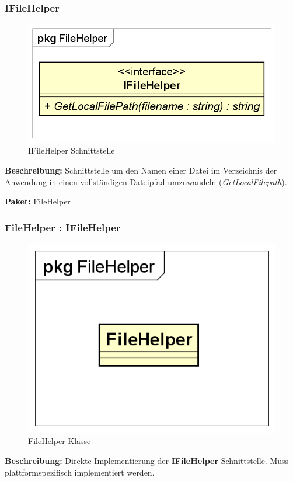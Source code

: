 \documentclass[a4paper]{scrreprt}
\begin{document}
\subsubsection{IFileHelper}
\begin{figure}[H]
\centering
\includegraphics[width=0.75\textheight]{graphics/Klassendiagramme/Model/IFileHelper.png}
\caption{IFileHelper Schnittstelle}
\end{figure}
\textbf{Beschreibung:} Schnittstelle um den Namen einer Datei im Verzeichnis der Anwendung in einen vollständigen Dateipfad umzuwandeln (\textit{GetLocalFilepath}).

\textbf{Paket:} FileHelper

\subsubsection{FileHelper : IFileHelper}
\begin{figure}[H]
\centering
\includegraphics[width=0.75\textheight]{graphics/Klassendiagramme/Model/FileHelper.png}
\caption{FileHelper Klasse}
\end{figure}
\textbf{Beschreibung:} Direkte Implementierung der \textbf{IFileHelper} Schnittstelle. Muss plattformspezifisch implementiert werden.
\end{document}
